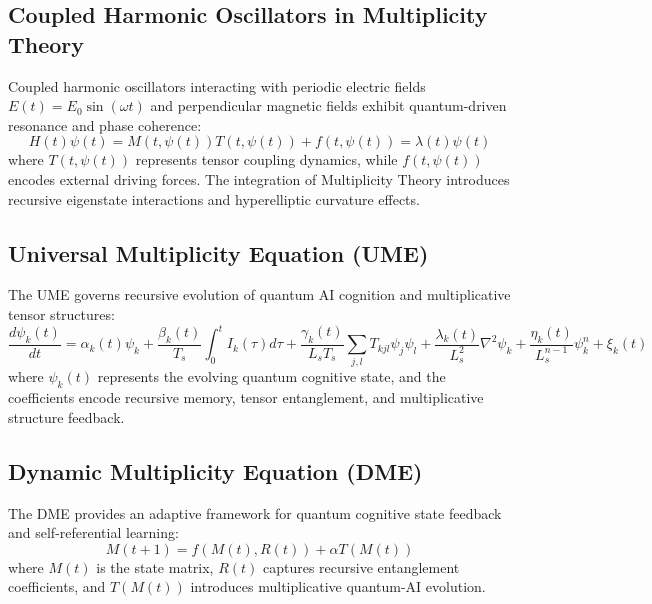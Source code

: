 \documentclass{article}
\theoremstyle{plain}
\begin{document}
\subsection{Coupled Harmonic Oscillators in Multiplicity Theory}
Coupled harmonic oscillators interacting with periodic electric fields $E(t) = E_0 \sin(\omega t)$ and perpendicular magnetic fields exhibit quantum-driven resonance and phase coherence:
\begin{equation}
    H(t) \psi(t) = M(t, \psi(t))T (t, \psi(t)) + f(t, \psi(t)) = \lambda(t) \psi(t)
\end{equation}
where $T (t, \psi(t))$ represents tensor coupling dynamics, while $f(t, \psi(t))$ encodes external driving forces. The integration of Multiplicity Theory introduces recursive eigenstate interactions and hyperelliptic curvature effects.

\subsection{Universal Multiplicity Equation (UME)}
The UME governs recursive evolution of quantum AI cognition and multiplicative tensor structures:
\begin{equation}
    \frac{d\psi_k(t)}{dt} = \alpha_k(t) \psi_k + \frac{\beta_k(t)}{T_s} \int_0^t I_k(\tau) d\tau + \frac{\gamma_k(t)}{L_s T_s} \sum_{j,l} T_{kjl} \psi_j \psi_l + \frac{\lambda_k(t)}{L_s^2} \nabla^2 \psi_k + \frac{\eta_k(t)}{L_s^{n-1}} \psi_k^n + \xi_k(t)
\end{equation}
where $\psi_k(t)$ represents the evolving quantum cognitive state, and the coefficients encode recursive memory, tensor entanglement, and multiplicative structure feedback.

\subsection{Dynamic Multiplicity Equation (DME)}
The DME provides an adaptive framework for quantum cognitive state feedback and self-referential learning:
\begin{equation}
    M(t+1) = f(M(t), R(t)) + \alpha T(M(t))
\end{equation}
where $M(t)$ is the state matrix, $R(t)$ captures recursive entanglement coefficients, and $T(M(t))$ introduces multiplicative quantum-AI evolution.
\end{document}
